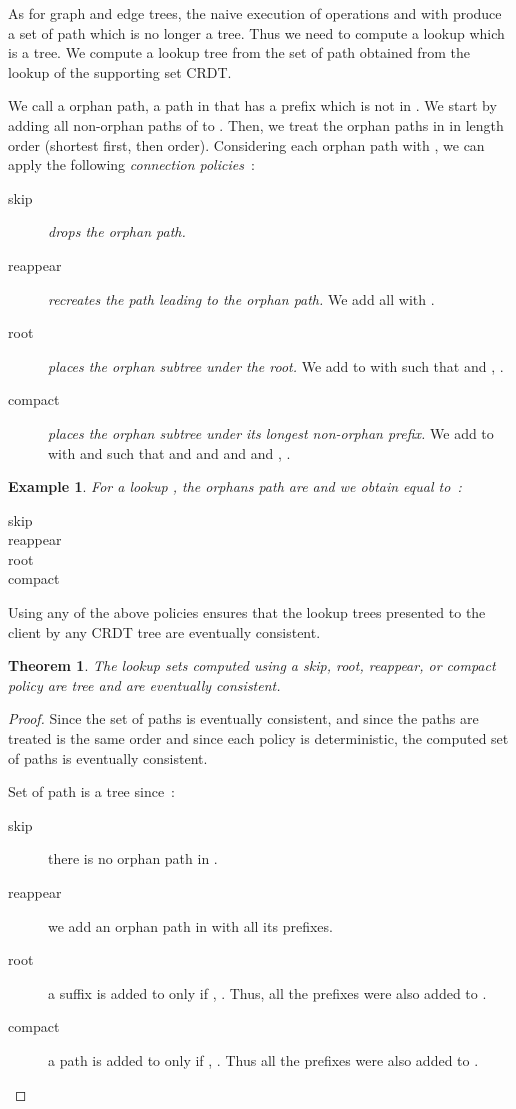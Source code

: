 \documentclass[a4paper]{article}
\newtheorem{theorem}{Theorem}
\newtheorem{example}{Example}
\begin{document}
As for graph and edge trees, the naive execution of operations
 and  with  produce a set of path which is
no longer a tree. Thus we need to compute a lookup which is a tree. We
compute a lookup tree  from the set of path  obtained from the
lookup of the supporting set CRDT.

We call a orphan path, a path in  that has a prefix which is not
in . We start by adding all non-orphan paths of  to
. Then, we treat the orphan paths in  in length order
(shortest first, then  order). Considering each orphan
path  with ,
we can apply the following {\em connection policies}~:

\begin{description}
\item[skip] {\em drops the orphan path.}
\item[reappear] {\em recreates the path leading to the orphan path.}
  We add all  with .
\item[root] {\em places the orphan subtree under the root.} We add  to  with  such that  and , .
\item[compact] {\em places the orphan subtree under its longest
    non-orphan prefix.} We add  to 
  with  and  such that  and  and
   and 
  and , .
\end{description}


\begin{example}
  For a lookup , the
  orphans path are  and we obtain  equal
  to~:
\begin{description}
\item[skip]     
\item[reappear] 
\item[root]     
\item[compact]  
\end{description}
\end{example} 

Using any of the above policies ensures that the lookup trees presented
to the client by any CRDT tree are eventually consistent.

\begin{theorem}
  The lookup sets  computed using a skip, root, reappear, or compact
  policy are tree and are eventually consistent.
\end{theorem}

\begin{proof}
  Since the set of paths  is eventually consistent, and since the
  paths are treated is the same order and since each policy is
  deterministic, the computed set of paths  is eventually
  consistent.

  Set of path  is a tree since~:
\begin{description}
\item[skip] there is no orphan path in .
\item[reappear] we add an orphan path in  with all its prefixes.
\item[root] a suffix  is added to  only if , . Thus, all the prefixes  were also added to .
\item[compact] a path  is added to  only
  if , . Thus all the
  prefixes  were also added to .
\end{description}
\end{proof}
\end{document}
